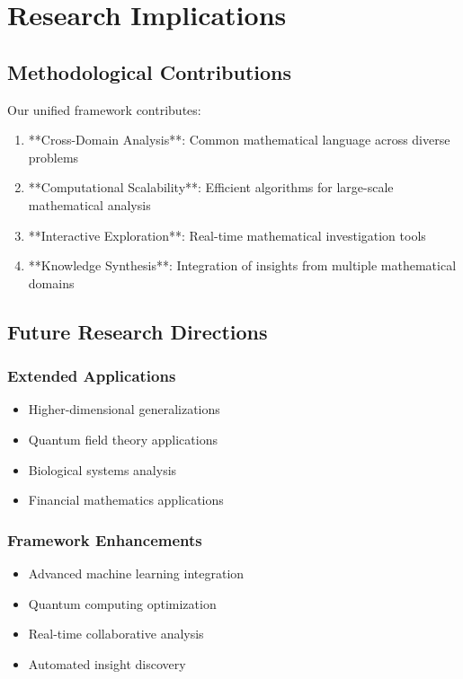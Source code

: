 \documentclass[12pt]{article}
\begin{document}
\section{Research Implications}

\subsection{Methodological Contributions}

Our unified framework contributes:
\begin{enumerate}
    \item **Cross-Domain Analysis**: Common mathematical language across diverse problems
    \item **Computational Scalability**: Efficient algorithms for large-scale mathematical analysis
    \item **Interactive Exploration**: Real-time mathematical investigation tools
    \item **Knowledge Synthesis**: Integration of insights from multiple mathematical domains
\end{enumerate}

\subsection{Future Research Directions}

\subsubsection{Extended Applications}
\begin{itemize}
    \item Higher-dimensional generalizations
    \item Quantum field theory applications
    \item Biological systems analysis
    \item Financial mathematics applications
\end{itemize}

\subsubsection{Framework Enhancements}
\begin{itemize}
    \item Advanced machine learning integration
    \item Quantum computing optimization
    \item Real-time collaborative analysis
    \item Automated insight discovery
\end{itemize}
\end{document}
